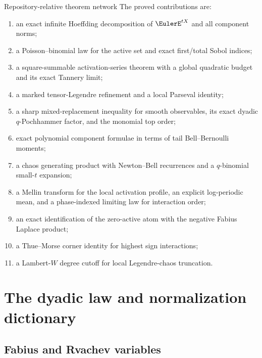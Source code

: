 \documentclass[11pt,oneside]{article}
\theoremstyle{definition}
\theoremstyle{remark}
\begin{document}
\begin{resultbox}{Repository-relative theorem network}
The proved contributions are:
\begin{enumerate}
\item an exact infinite Hoeffding decomposition of $\EulerE^{tX}$ and all component
      norms;
\item a Poisson--binomial law for the active set and exact first/total Sobol
      indices;
\item a square-summable activation-series theorem with a global quadratic
      budget and its exact Tannery limit;
\item a marked tensor-Legendre refinement and a local Parseval identity;
\item a sharp mixed-replacement inequality for smooth observables, its exact
      dyadic $q$-Pochhammer factor, and the monomial top order;
\item exact polynomial component formulae in terms of tail Bell--Bernoulli
      moments;
\item a chaos generating product with Newton--Bell recurrences and a
      $q$-binomial small-$t$ expansion;
\item a Mellin transform for the local activation profile, an explicit
      log-periodic mean, and a phase-indexed limiting law for interaction order;
\item an exact identification of the zero-active atom with the negative Fabius
      Laplace product;
\item a Thue--Morse corner identity for highest sign interactions;
\item a Lambert-$W$ degree cutoff for local Legendre-chaos truncation.
\end{enumerate}
\end{resultbox}

\section{The dyadic law and normalization dictionary}
\label{sec:baseline}

\subsection{Fabius and Rvachev variables}
\end{document}
